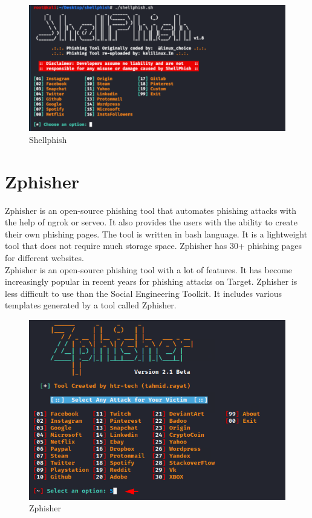 \documentclass[openany]{report}
\begin{document}
\begin{figure}[H]
    \centering
    \includegraphics[width=.95\textwidth]{shellphish.png}
    \caption{Shellphish}
    \label{fig:shellphish}
\end{figure}

\section{Zphisher}
Zphisher is an open-source phishing tool that automates phishing attacks with the help of ngrok or serveo. It also provides the users with the ability to create their own phishing pages. The tool is written in bash language. It is a lightweight tool that does not require much storage space. Zphisher has 30+ phishing pages for different websites.\\

Zphisher is an open-source phishing tool with a lot of features. It has become increasingly popular in recent years for phishing attacks on Target. Zphisher is less difficult to use than the Social Engineering Toolkit. It includes various templates generated by a tool called Zphisher.

\begin{figure}[H]
    \centering
    \includegraphics[width=.95\textwidth]{zphisher.png}
    \caption{Zphisher}
    \label{fig:shellphish}
\end{figure}
\end{document}
